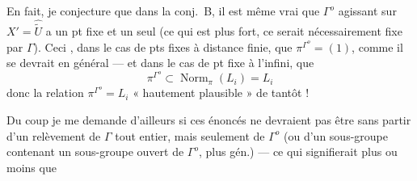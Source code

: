 \documentclass[11pt,a4paper]{article}
\begin{document}
En fait, je conjecture que dans la conj.~B, il est même vrai que $\Gamma^{o}$
agissant sur $X' = \widehat{\widetilde{U}}$ a un pt fixe et un seul (ce qui est
plus fort,  ce  serait nécessairement fixe par
$\Gamma$). Ceci  , dans le cas de pts fixes à
distance finie, que $\pi^{\Gamma^{o}} = (1)$, comme il se devrait en général —
et dans le cas de pt fixe à l'infini, que
\[
  \pi^{\Gamma^{o}} \subset \operatorname{Norm}_{\pi}(L_i) = L_i
\]
donc la relation $\pi^{\Gamma^{o}} = L_i$ « hautement plausible » de tantôt !

Du coup je me demande d'ailleurs si ces énoncés ne devraient pas être
 sans partir d'un relèvement de $\Gamma$ tout entier, mais
seulement de $\Gamma^{o}$ (ou d'un sous-groupe contenant un sous-groupe ouvert
de $\Gamma^{o}$, plus gén.) — ce qui signifierait plus ou moins que
\end{document}
